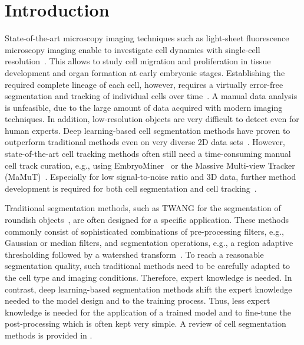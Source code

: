 \documentclass[10pt,letterpaper]{article}
\begin{document}
\section*{Introduction}
\label{sec:introduction}State-of-the-art microscopy imaging techniques such as light-sheet fluorescence microscopy imaging enable to investigate cell dynamics with single-cell resolution~\cite{Chhetri2015, Kobitski2015}. This allows to study cell migration and proliferation in tissue development and organ formation at early embryonic stages. Establishing the required complete lineage of each cell, however, requires a virtually error-free segmentation and tracking of individual cells over time~\cite{Kobitski2015,Khairy2011}. A manual data analysis is unfeasible, due to the large amount of data acquired with modern imaging techniques. In addition, low-resolution objects are very difficult to detect even for human experts. Deep learning-based cell segmentation methods have proven to outperform traditional methods even on very diverse 2D data sets~\cite{Caicedo2019}. However, state-of-the-art cell tracking methods often still need a time-consuming manual cell track curation, e.g., using EmbryoMiner~\cite{Schott2018} or the Massive Multi-view Tracker (MaMuT)~\cite{Wolff2018}. Especially for low signal-to-noise ratio and 3D data, further method development is required for both cell segmentation and cell tracking~\cite{Ulman2017}.

Traditional segmentation methods, such as TWANG for the segmentation of roundish objects~\cite{Stegmaier2014}, are often designed for a specific application. These methods commonly consist of sophisticated combinations of pre-processing filters, e.g., Gaussian or median filters, and segmentation operations, e.g., a region adaptive thresholding followed by a watershed transform~\cite{Maska2014}. To reach a reasonable segmentation quality, such traditional methods need to be carefully adapted to the cell type and imaging conditions. Therefore, expert knowledge is needed. In contrast, deep learning-based segmentation methods shift the expert knowledge needed to the model design and to the training process. Thus, less expert knowledge is needed for the application of a trained model and to fine-tune the post-processing which is often kept very simple. A review of cell segmentation methods is provided in \cite{Vicar2019}.
\end{document}
